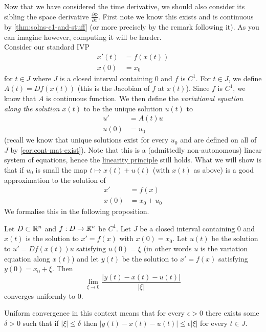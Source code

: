 Now that we have considered the time derivative, we should also consider its sibling the space derivative $\frac{\partial \Phi}{\partial x}$. First note we know this exists and is continuous by \autoref{thm:solns-c1-and-stuff} (or more precisely by the remark following it). As you can imagine however, computing it will be harder.\\

Consider our standard IVP
\begin{align*}
    x'(t) &= f(x(t))\\
    x(0) &= x_0
\end{align*}
for $t \in J$ where $J$ is a closed interval containing 0 and $f$ is $C^1$. For $t \in J$, we define $A(t) = Df(x(t))$ (this is the Jacobian of $f$ at $x(t)$). Since $f$ is $C^1$, we know that $A$ is continuous function. We then define the \textit{variational equation along the solution $x(t)$} to be the unique solution $u(t)$ to
\begin{align*}
    u' &= A(t)u\\
    u(0) &= u_0
\end{align*}
(recall we know that unique solutions exist for every $u_0$ and are defined on all of $J$ by \autoref{cor:cont-mat-exist}). Note that this is a (admittedly non-autonomous) linear system of equations, hence the \hyperref[sec:superposition-principle]{linearity principle} still holds. What we will show is that if $u_0$ is small the map $t \mapsto x(t) + u(t)$ (with $x(t)$ as above) is a good approximation to the solution of
\begin{align*}
    x' &= f(x)\\
    x(0) &= x_0 + u_0
\end{align*} 
We formalise this in the following proposition.
\begin{proposition}\label{prop:approx-solns}
    Let $D \subset \mathbb{R}^n$ and $f: D \to \mathbb{R}^n$ be $C^1$.
    Let $J$ be a closed interval containing 0 and $x(t)$ is the solution to $x' = f(x)$ with $x(0) = x_0$. Let $u(t)$ be the solution to $u' = Df(x(t)) u$ satisfying $u(0) = \xi$ (in other words $u$ is the variation equation along $x(t)$) and let $y(t)$ be the solution to $x' = f(x)$ satisfying $y(0) = x_0 + \xi$. Then
    $$ \lim_{\xi \to 0} \frac{|y(t) - x(t) - u(t)|}{|\xi|} $$
    converges uniformly to 0.
\end{proposition}
\begin{remark}
    Uniform convergence in this context means that for every $\epsilon > 0$ there exists some $\delta > 0$ such that if $|\xi| \leq \delta$ then $|y(t) - x(t) - u(t)| \leq \epsilon|\xi|$ for every $t \in J$.
\end{remark}
